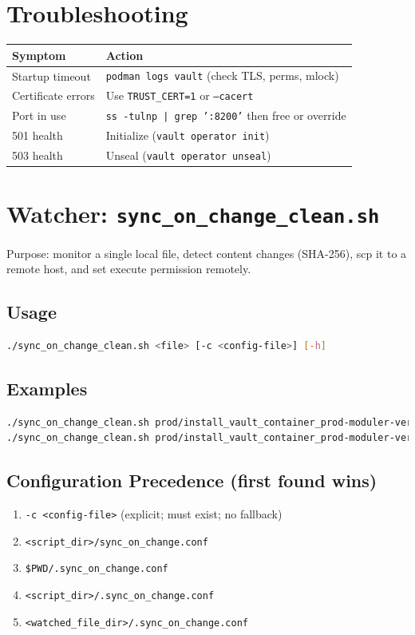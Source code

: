 \documentclass[12pt]{article}
\begin{document}
\section{Troubleshooting}
\footnotesize
\begin{longtable}{@{}p{3.5cm}p{7.5cm}@{}}
\toprule
Symptom & Action \\
\midrule
\endhead
Startup timeout & \texttt{podman logs vault} (check TLS, perms, mlock) \\
Certificate errors & Use \texttt{TRUST\_CERT=1} or \texttt{--cacert} \\
Port in use & \texttt{ss -tulnp | grep ':8200'} then free or override \\
501 health & Initialize (\texttt{vault operator init}) \\
503 health & Unseal (\texttt{vault operator unseal}) \\
\bottomrule
\end{longtable}
\normalsize

\section{Watcher: \texttt{sync\_on\_change\_clean.sh}}
Purpose: monitor a single local file, detect content changes (SHA-256), scp it to a remote host, and set execute permission remotely.

\subsection*{Usage}
\begin{lstlisting}[language=bash]
./sync_on_change_clean.sh <file> [-c <config-file>] [-h]
\end{lstlisting}

\subsection*{Examples}
\begin{lstlisting}[language=bash]
./sync_on_change_clean.sh prod/install_vault_container_prod-moduler-version-clean-working.sh
./sync_on_change_clean.sh prod/install_vault_container_prod-moduler-version-clean-working.sh -c ./sync_on_change.conf
\end{lstlisting}

\subsection*{Configuration Precedence (first found wins)}
\begin{enumerate}
  \item \texttt{-c <config-file>} (explicit; must exist; no fallback)
  \item \texttt{<script\_dir>/sync\_on\_change.conf}
  \item \texttt{\$PWD/.sync\_on\_change.conf}
  \item \texttt{<script\_dir>/.sync\_on\_change.conf}
  \item \texttt{<watched\_file\_dir>/.sync\_on\_change.conf}
\end{enumerate}
\end{document}

